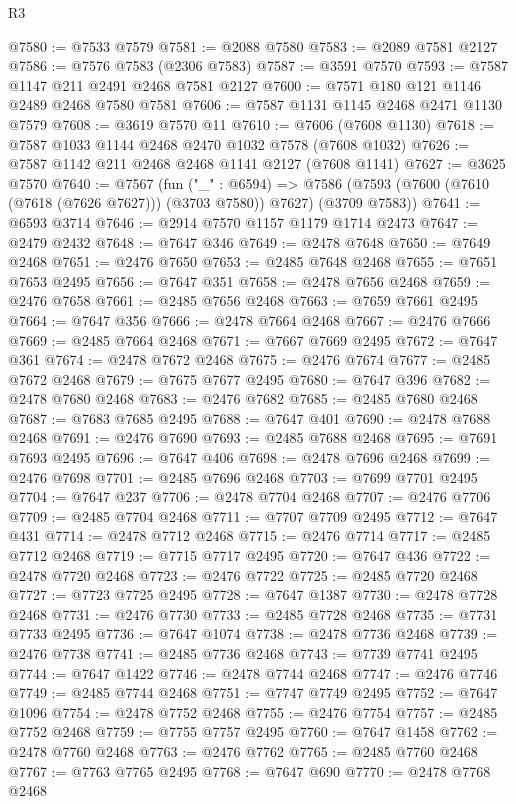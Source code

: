 \begin{lexlean}{R3}
\begin{coremodule}
@7580 := @7533 @7579
@7581 := @2088 @7580
@7583 := @2089 @7581 @2127
@7586 := @7576 @7583 (@2306 @7583)
@7587 := @3591 @7570
@7593 := @7587 @1147 @211 @2491 @2468 @7581 @2127
@7600 := @7571 @180 @121 @1146 @2489 @2468 @7580 @7581
@7606 := @7587 @1131 @1145 @2468 @2471 @1130 @7579
@7608 := @3619 @7570 @11
@7610 := @7606 (@7608 @1130)
@7618 := @7587 @1033 @1144 @2468 @2470 @1032 @7578 (@7608 @1032)
@7626 := @7587 @1142 @211 @2468 @2468 @1141 @2127 (@7608 @1141)
@7627 := @3625 @7570
@7640 := @7567
    (fun ("_" : @6594) =>
    @7586 (@7593 (@7600 (@7610 (@7618 (@7626 @7627))) (@3703 @7580)) @7627) (@3709 @7583))
@7641 := @6593 @3714
@7646 := @2914 @7570 @1157 @1179 @1714 @2473
@7647 := @2479 @2432
@7648 := @7647 @346
@7649 := @2478 @7648
@7650 := @7649 @2468
@7651 := @2476 @7650
@7653 := @2485 @7648 @2468
@7655 := @7651 @7653 @2495
@7656 := @7647 @351
@7658 := @2478 @7656 @2468
@7659 := @2476 @7658
@7661 := @2485 @7656 @2468
@7663 := @7659 @7661 @2495
@7664 := @7647 @356
@7666 := @2478 @7664 @2468
@7667 := @2476 @7666
@7669 := @2485 @7664 @2468
@7671 := @7667 @7669 @2495
@7672 := @7647 @361
@7674 := @2478 @7672 @2468
@7675 := @2476 @7674
@7677 := @2485 @7672 @2468
@7679 := @7675 @7677 @2495
@7680 := @7647 @396
@7682 := @2478 @7680 @2468
@7683 := @2476 @7682
@7685 := @2485 @7680 @2468
@7687 := @7683 @7685 @2495
@7688 := @7647 @401
@7690 := @2478 @7688 @2468
@7691 := @2476 @7690
@7693 := @2485 @7688 @2468
@7695 := @7691 @7693 @2495
@7696 := @7647 @406
@7698 := @2478 @7696 @2468
@7699 := @2476 @7698
@7701 := @2485 @7696 @2468
@7703 := @7699 @7701 @2495
@7704 := @7647 @237
@7706 := @2478 @7704 @2468
@7707 := @2476 @7706
@7709 := @2485 @7704 @2468
@7711 := @7707 @7709 @2495
@7712 := @7647 @431
@7714 := @2478 @7712 @2468
@7715 := @2476 @7714
@7717 := @2485 @7712 @2468
@7719 := @7715 @7717 @2495
@7720 := @7647 @436
@7722 := @2478 @7720 @2468
@7723 := @2476 @7722
@7725 := @2485 @7720 @2468
@7727 := @7723 @7725 @2495
@7728 := @7647 @1387
@7730 := @2478 @7728 @2468
@7731 := @2476 @7730
@7733 := @2485 @7728 @2468
@7735 := @7731 @7733 @2495
@7736 := @7647 @1074
@7738 := @2478 @7736 @2468
@7739 := @2476 @7738
@7741 := @2485 @7736 @2468
@7743 := @7739 @7741 @2495
@7744 := @7647 @1422
@7746 := @2478 @7744 @2468
@7747 := @2476 @7746
@7749 := @2485 @7744 @2468
@7751 := @7747 @7749 @2495
@7752 := @7647 @1096
@7754 := @2478 @7752 @2468
@7755 := @2476 @7754
@7757 := @2485 @7752 @2468
@7759 := @7755 @7757 @2495
@7760 := @7647 @1458
@7762 := @2478 @7760 @2468
@7763 := @2476 @7762
@7765 := @2485 @7760 @2468
@7767 := @7763 @7765 @2495
@7768 := @7647 @690
@7770 := @2478 @7768 @2468

\end{coremodule}
\end{lexlean}
